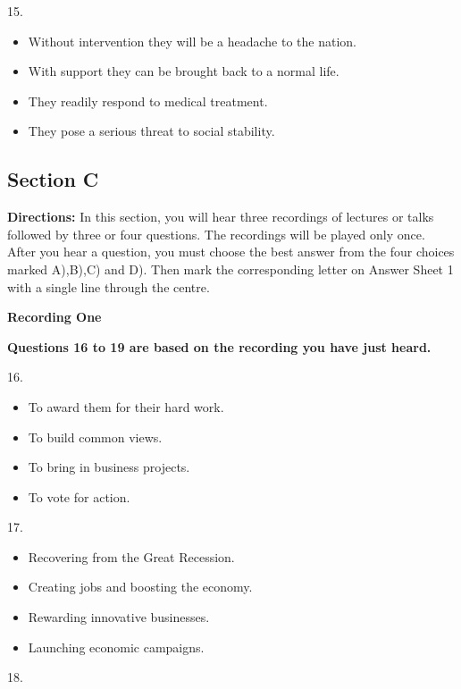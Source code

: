 \documentclass[UTF8,11pt]{ctexart}
\begin{document}
15.


\begin{itemize}[leftmargin=2em,itemsep=.2em,topsep=.4em]\item[A.] Without intervention they will be a headache to the nation.
\item[B.] With support they can be brought back to a normal life.
\item[C.] They readily respond to medical treatment.
\item[D.] They pose a serious threat to social stability.
\end{itemize}

\subsection*{\textbf{Section C}}


\textbf{Directions:} In this section, you will hear three recordings of lectures or talks followed by three or four questions. The recordings will be played only once. After you hear a question, you must choose the best answer from the four choices marked A),B),C) and D). Then mark the corresponding letter on Answer Sheet 1 with a single line through the centre.


\textbf{Recording One}


\textbf{Questions 16 to 19 are based on the recording you have just heard.}


16.


\begin{itemize}[leftmargin=2em,itemsep=.2em,topsep=.4em]\item[A.] To award them for their hard work.
\item[B.] To build common views.
\item[C.] To bring in business projects.
\item[D.] To vote for action.
\end{itemize}

17.


\begin{itemize}[leftmargin=2em,itemsep=.2em,topsep=.4em]\item[A.] Recovering from the Great Recession.
\item[B.] Creating jobs and boosting the economy.
\item[C.] Rewarding innovative businesses.
\item[D.] Launching economic campaigns.
\end{itemize}

18.
\end{document}
